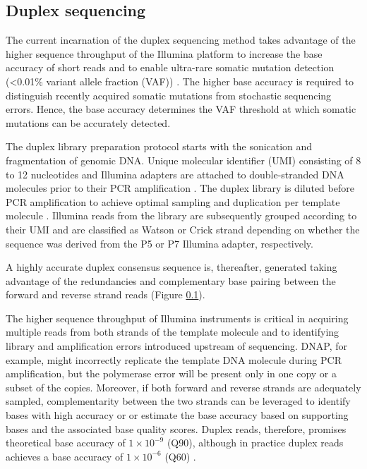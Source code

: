\subsection{Duplex sequencing}

The current incarnation of the duplex sequencing method takes advantage of the higher sequence throughput of the Illumina platform to increase the base accuracy of short reads and to enable ultra-rare somatic mutation detection (<0.01\% variant allele fraction (VAF)) \cite{Schmitt2012-yr}. The higher base accuracy is required to distinguish recently acquired somatic mutations from stochastic sequencing errors. Hence, the base accuracy determines the VAF threshold at which somatic mutations can be accurately detected. 


The duplex library preparation protocol starts with the sonication and fragmentation of genomic DNA. Unique molecular identifier (UMI) consisting of 8 to 12 nucleotides and Illumina adapters are attached to double-stranded DNA molecules prior to their PCR amplification \cite{Schmitt2012-yr}. The duplex library is diluted before PCR amplification to achieve optimal sampling and duplication per template molecule \cite{Hoang2016-jx, Abascal2021-pk}. Illumina reads from the library are subsequently grouped according to their UMI and are classified as Watson or Crick strand depending on whether the sequence was derived from the P5 or P7 Illumina adapter, respectively. 

A highly accurate duplex consensus sequence is, thereafter, generated taking advantage of the redundancies and complementary base pairing between the forward and reverse strand reads (Figure \ref{}). 

%

The higher sequence throughput of Illumina instruments is critical in acquiring multiple reads from both strands of the template molecule and to identifying library and amplification errors introduced upstream of sequencing. DNAP, for example, might incorrectly replicate the template DNA molecule during PCR amplification, but the polymerase error will be present only in one copy or a subset of the copies. Moreover, if both forward and reverse strands are adequately sampled, complementarity between the two strands can be leveraged to identify bases with high accuracy or \cite{Schmitt2012-yr} or estimate the base accuracy \cite{Abascal2021-pk} based on supporting bases and the associated base quality scores. Duplex reads, therefore, promises theoretical base accuracy of $1 \times 10^{-9}$ (Q90), although in practice duplex reads achieves a base accuracy of $1 \times 10^{-6}$ (Q60) \cite{Schmitt2012-yr}.


